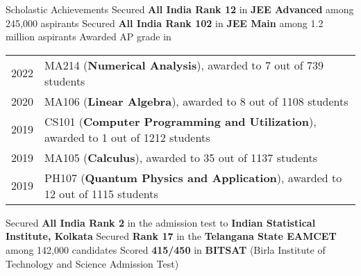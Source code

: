 \begin{rubric}{Scholastic Achievements}
    \entry*[2019] Secured \textbf{All India Rank 12} in \textbf{JEE Advanced} among 245,000 aspirants
    \entry*[2019\phantom{}] Secured \textbf{All India Rank 102} in \textbf{JEE Main} among 1.2 million aspirants
    \entry* Awarded AP grade in
        
        \begin{tabular}{@{}ll}
           2022 & MA214 (\textbf{Numerical Analysis}), awarded to 7 out of 739 students \\
           2020 & MA106 (\textbf{Linear Algebra}), awarded to 8 out of 1108 students \\
           2019 & CS101 (\textbf{Computer Programming and Utilization}), awarded to 1 out of 1212 students \\
           2019 & MA105 (\textbf{Calculus}), awarded to 35 out of 1137 students \\
           2019 & PH107 (\textbf{Quantum Physics and Application}), awarded to 12 out of 1115 students \\
        \end{tabular}
    \entry*[2019] Secured \textbf{All India Rank 2} in the admission test to \textbf{Indian Statistical Institute, Kolkata}
    \entry*[2019\phantom{}] Secured \textbf{Rank 17} in the \textbf{Telangana State EAMCET} among 142,000 candidates
    \entry*[2019] Scored \textbf{415/450} in \textbf{BITSAT} (Birla Institute of Technology and Science Admission Test)
\end{rubric}